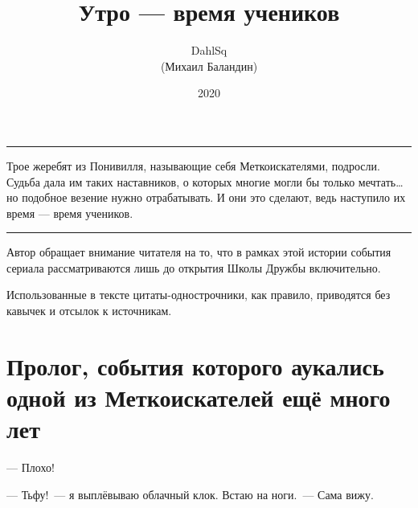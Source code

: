 \documentclass[fontsize=11pt,a5paper,titlepage=firstcover]{scrbook}
\begin{document}
\begin{titlepage}
	\title{Утро — время учеников}
	\author{DahlSq\\(Михаил Баландин)}
	\date{2020}
	\publishers{\texttt{\url{http://fanfiction.balandin.online}}\\
		\texttt{\url{https://ficbook.net/authors/2707630}}}
\end{titlepage}

\frontmatter

\maketitle

\clearpage
\thispagestyle{empty}

\mbox{}

\vspace{2cm}

\hrule

\bigskip

\noindent Трое жеребят из Понивилля, называющие себя Меткоискателями, подросли. Судьба дала им таких наставников, о которых многие могли бы только мечтать… но подобное везение нужно отрабатывать. И они это сделают, ведь наступило их время — время учеников.

\bigskip

\hrule

\vspace{2cm}

\noindent Автор обращает внимание читателя на то, что в рамках этой истории события сериала рассматриваются лишь до открытия Школы Дружбы включительно.

\bigskip

\noindent Использованные в тексте цитаты-однострочники, как правило, приводятся без кавычек и отсылок к источникам.

\clearpage

\tableofcontents


\mainmatter

\chapter*{Пролог, события которого аукались одной из Меткоискателей ещё много лет}


--- Плохо!

--- Тьфу!~--- я выплёвываю облачный клок. Встаю на ноги.~--- Сама вижу.
\end{document}
